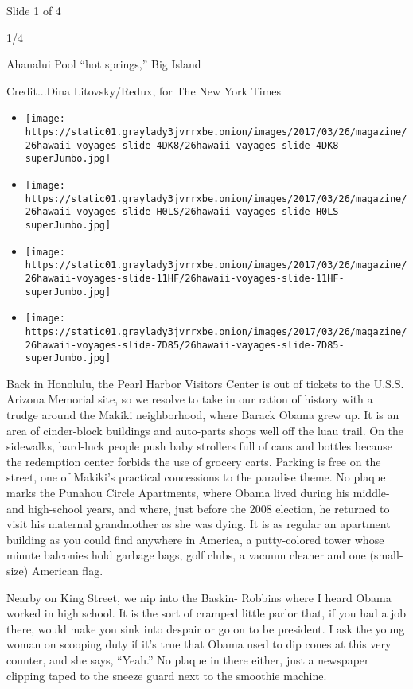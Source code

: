 Slide 1 of 4

1/4

Ahanalui Pool ``hot springs,'' Big Island

Credit...Dina Litovsky/Redux, for The New York Times

\begin{itemize}
\item
  \texttt{[image: https://static01.graylady3jvrrxbe.onion/images/2017/03/26/magazine/26hawaii-voyages-slide-4DK8/26hawaii-vayages-slide-4DK8-superJumbo.jpg]}
\item
  \texttt{[image: https://static01.graylady3jvrrxbe.onion/images/2017/03/26/magazine/26hawaii-voyages-slide-H0LS/26hawaii-vayages-slide-H0LS-superJumbo.jpg]}
\item
  \texttt{[image: https://static01.graylady3jvrrxbe.onion/images/2017/03/26/magazine/26hawaii-voyages-slide-11HF/26hawaii-voyages-slide-11HF-superJumbo.jpg]}
\item
  \texttt{[image: https://static01.graylady3jvrrxbe.onion/images/2017/03/26/magazine/26hawaii-voyages-slide-7D85/26hawaii-vayages-slide-7D85-superJumbo.jpg]}
\end{itemize}

Back in Honolulu, the Pearl Harbor Visitors Center is out of tickets to
the U.S.S. Arizona Memorial site, so we resolve to take in our ration of
history with a trudge around the Makiki neighborhood, where Barack Obama
grew up. It is an area of cinder-block buildings and auto-parts shops
well off the luau trail. On the sidewalks, hard-luck people push baby
strollers full of cans and bottles because the redemption center forbids
the use of grocery carts. Parking is free on the street, one of Makiki's
practical concessions to the paradise theme. No plaque marks the Punahou
Circle Apartments, where Obama lived during his middle- and high-school
years, and where, just before the 2008 election, he returned to visit
his maternal grandmother as she was dying. It is as regular an apartment
building as you could find anywhere in America, a putty-colored tower
whose minute balconies hold garbage bags, golf clubs, a vacuum cleaner
and one (small-size) American flag.

Nearby on King Street, we nip into the Baskin- Robbins where I heard
Obama worked in high school. It is the sort of cramped little parlor
that, if you had a job there, would make you sink into despair or go on
to be president. I ask the young woman on scooping duty if it's true
that Obama used to dip cones at this very counter, and she says,
``Yeah.'' No plaque in there either, just a newspaper clipping taped to
the sneeze guard next to the smoothie machine.

